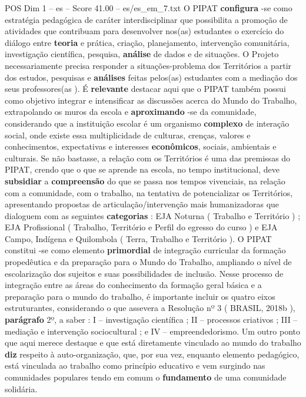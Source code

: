 \begin{textsample}{POS Dim 1 – es – Score 41.00 – es/es\_em\_7.txt}
O PIPAT \textbf{configura} -se como estratégia pedagógica de caráter interdisciplinar que possibilita a promoção de atividades que contribuam para desenvolver nos(as) estudantes o exercício do diálogo entre \textbf{teoria} e prática, criação, planejamento, intervenção comunitária, investigação científica, pesquisa, \textbf{análise} de dados e de situações.
O Projeto necessariamente precisa responder a situações-problema dos Territórios a partir dos estudos, pesquisas e \textbf{análises} feitas pelos(as) estudantes com a mediação dos seus professores(as ).
É \textbf{relevante} destacar aqui que o PIPAT também possui como objetivo integrar e intensificar as discussões acerca do Mundo do Trabalho, extrapolando os muros da escola e \textbf{aproximando} -se da comunidade, considerando que a instituição escolar é um organismo \textbf{complexo} de interação social, onde existe essa multiplicidade de culturas, crenças, valores e conhecimentos, expectativas e interesses \textbf{econômicos}, sociais, ambientais e culturais.
Se não bastasse, a relação com os Territórios é uma das premissas do PIPAT, crendo que o que se aprende na escola, no tempo institucional, deve \textbf{subsidiar} a \textbf{compreensão} do que se passa nos tempos vivenciais, na relação com a comunidade, com o trabalho, na tentativa de potencializar os Territórios, apresentando propostas de articulação/intervenção mais humanizadoras que dialoguem com as seguintes \textbf{categorias} : EJA Noturna ( Trabalho e Território ) ; EJA Profissional ( Trabalho, Território e Perfil do egresso do curso ) e EJA Campo, Indígena e Quilombola ( Terra, Trabalho e Território ).
O PIPAT constitui -se como elemento \textbf{primordial} de integração curricular da formação propedêutica e da preparação para o Mundo do Trabalho, ampliando o nível de escolarização dos sujeitos e suas possibilidades de inclusão.
Nesse processo de integração entre as áreas do conhecimento da formação geral básica e a preparação para o mundo do trabalho, é importante incluir os quatro eixos estruturantes, considerando o que assevera a Resolução nº 3 ( BRASIL, 2018b ), \textbf{parágrafo} 2º, a saber : I – investigação científica ; II – processos criativos ; III – mediação e intervenção sociocultural ; e IV – empreendedorismo.
Um outro ponto que aqui merece destaque e que está diretamente vinculado ao mundo do trabalho \textbf{diz} respeito à auto-organização, que, por sua vez, enquanto elemento pedagógico, está vinculada ao trabalho como princípio educativo e vem surgindo nas comunidades populares tendo em comum o \textbf{fundamento} de uma comunidade solidária.

\end{textsample}
